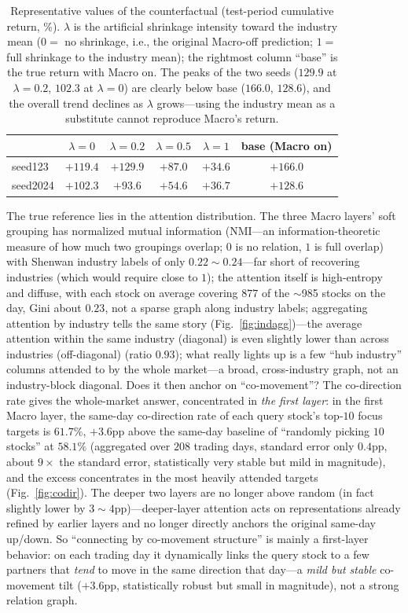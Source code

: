 \documentclass[a4paper,11pt]{article}
\begin{document}
\begin{table}[H]
\centering
\caption{Representative values of the counterfactual (test-period cumulative
return, \%). $\lambda$ is the artificial shrinkage intensity toward the
industry mean ($0{=}$ no shrinkage, i.e., the original Macro-off prediction;
$1{=}$ full shrinkage to the industry mean); the rightmost column ``base'' is
the true return with Macro on. The peaks of the two seeds ($129.9$ at
$\lambda{=}0.2$, $102.3$ at $\lambda{=}0$) are clearly below base ($166.0$,
$128.6$), and the overall trend declines as $\lambda$ grows---using the
industry mean as a substitute cannot reproduce Macro's return.}
\label{tab:lambda}
\begin{tabular}{lccccc}
\toprule
& $\lambda{=}0$ & $\lambda{=}0.2$ & $\lambda{=}0.5$ & $\lambda{=}1$ & base (Macro on) \\
\midrule
seed123  & $+119.4$ & $+129.9$ & $+87.0$ & $+34.6$ & $+166.0$ \\
seed2024 & $+102.3$ & $+93.6$  & $+54.6$ & $+36.7$ & $+128.6$ \\
\bottomrule
\end{tabular}
\end{table}

The true reference lies in the attention distribution. The three Macro layers'
soft grouping has normalized mutual information (NMI---an information-theoretic
measure of how much two groupings overlap; $0$ is no relation, $1$ is full
overlap) with Shenwan industry labels of only $0.22\!\sim\!0.24$---far short of
recovering industries (which would require close to $1$); the attention itself
is high-entropy and diffuse, with each stock on average covering $877$ of the
$\sim$985 stocks on the day, Gini about $0.23$, not a sparse graph along
industry labels; aggregating attention by industry tells the same story
(Fig.~\ref{fig:indagg})---the average attention within the same industry
(diagonal) is even slightly lower than across industries (off-diagonal) (ratio
$0.93$); what really lights up is a few ``hub industry'' columns attended to by
the whole market---a broad, cross-industry graph, not an industry-block
diagonal. Does it then anchor on ``co-movement''? The co-direction rate gives
the whole-market answer, concentrated in \emph{the first layer}: in the first
Macro layer, the same-day co-direction rate of each query stock's top-$10$
focus targets is $61.7\%$, $+3.6$pp above the same-day baseline of ``randomly
picking $10$ stocks'' at $58.1\%$ (aggregated over $208$ trading days, standard
error only $0.4$pp, about $9\times$ the standard error, statistically very
stable but mild in magnitude), and the excess concentrates in the most heavily
attended targets (Fig.~\ref{fig:codir}). The deeper two layers are no longer
above random (in fact slightly lower by $3\!\sim\!4$pp)---deeper-layer
attention acts on representations already refined by earlier layers and no
longer directly anchors the original same-day up/down. So ``connecting by
co-movement structure'' is mainly a first-layer behavior: on each trading day
it dynamically links the query stock to a few partners that \emph{tend} to move
in the same direction that day---a \emph{mild but stable} co-movement tilt
($+3.6$pp, statistically robust but small in magnitude), not a strong relation
graph.
\end{document}
